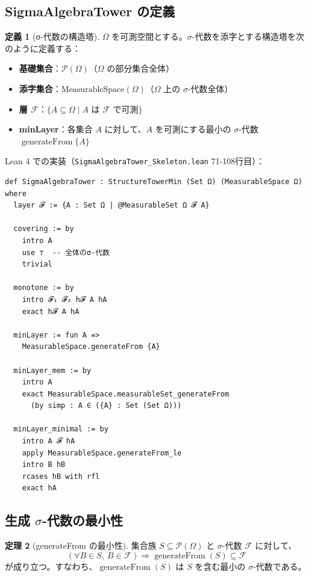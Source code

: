 \documentclass[12pt,a4paper]{article}
\theoremstyle{definition}
\newtheorem{definition}{定義}[section]
\newtheorem{theorem}[definition]{定理}
\newcommand{\cF}{\mathcal{F}}
\DeclareMathOperator{\generateFrom}{generateFrom}
\begin{document}
\subsection{SigmaAlgebraTower の定義}

\begin{definition}[σ-代数の構造塔]
$\Omega$ を可測空間とする。$\sigma$-代数を添字とする構造塔を次のように定義する：
\begin{itemize}
\item \textbf{基礎集合}：$\mathcal{P}(\Omega)$（$\Omega$ の部分集合全体）
\item \textbf{添字集合}：$\text{MeasurableSpace}(\Omega)$（$\Omega$ 上の $\sigma$-代数全体）
\item \textbf{層 $\cF$}：$\{A \subseteq \Omega \mid A \text{ は } \cF \text{ で可測}\}$
\item \textbf{minLayer}：各集合 $A$ に対して、$A$ を可測にする最小の $\sigma$-代数 $\generateFrom\{A\}$
\end{itemize}
\end{definition}

Lean 4 での実装（\texttt{SigmaAlgebraTower\_Skeleton.lean} 71-108行目）：

\begin{lstlisting}[language=Lean]
def SigmaAlgebraTower : StructureTowerMin (Set Ω) (MeasurableSpace Ω) where
  layer 𝓕 := {A : Set Ω | @MeasurableSet Ω 𝓕 A}
  
  covering := by
    intro A
    use ⊤  -- 全体のσ-代数
    trivial
  
  monotone := by
    intro 𝓕₁ 𝓕₂ h𝓕 A hA
    exact h𝓕 A hA
  
  minLayer := fun A =>
    MeasurableSpace.generateFrom {A}
  
  minLayer_mem := by
    intro A
    exact MeasurableSpace.measurableSet_generateFrom
      (by simp : A ∈ ({A} : Set (Set Ω)))
  
  minLayer_minimal := by
    intro A 𝓕 hA
    apply MeasurableSpace.generateFrom_le
    intro B hB
    rcases hB with rfl
    exact hA
\end{lstlisting}

\subsection{生成 $\sigma$-代数の最小性}

\begin{theorem}[generateFrom の最小性]
集合族 $S \subseteq \mathcal{P}(\Omega)$ と $\sigma$-代数 $\cF$ に対して、
\[
(\forall B \in S,\ B \in \cF) \Longrightarrow \generateFrom(S) \subseteq \cF
\]
が成り立つ。すなわち、$\generateFrom(S)$ は $S$ を含む最小の $\sigma$-代数である。
\end{theorem}
\end{document}
